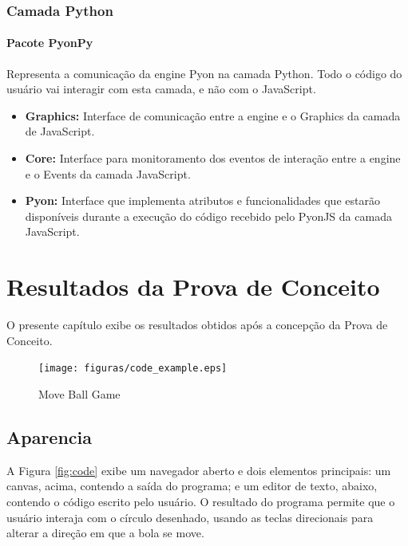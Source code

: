 \begin{apendicesenv}
\subsection{Camada Python}

\subsubsection{Pacote PyonPy}

Representa a comunicação da engine Pyon na camada Python. Todo o código do usuário vai interagir com esta camada, e não com o JavaScript.

\begin{itemize}
    \item \textbf{Graphics:} Interface de comunicação entre a engine e o Graphics da camada de JavaScript.
    \item \textbf{Core:} Interface para monitoramento dos eventos de interação entre a engine e o Events da camada JavaScript.
    \item \textbf{Pyon:} Interface que implementa atributos e funcionalidades que estarão disponíveis durante a execução do código recebido pelo PyonJS da camada JavaScript.
\end{itemize}

%
%

\chapter[Resultados da Prova de Conceito]{Resultados da Prova de Conceito}
\label{apendice:resultados_poc}

O presente capítulo exibe os resultados obtidos após a concepção da Prova de Conceito.

\begin{figure}[!ht]
    \centering
    \caption{Move Ball Game}
    \texttt{[image: figuras/code\_example.eps]}
    \label{fig:arquitetura_poc_code}
\end{figure}

\section{Aparencia}

A Figura \ref{fig:code} exibe um navegador aberto e dois elementos principais: um canvas, acima, contendo a saída do programa; e um editor de texto, abaixo, contendo o código escrito pelo usuário. O resultado do programa permite que o usuário interaja com o círculo desenhado, usando as teclas direcionais para alterar a direção em que a bola se move.


\end{apendicesenv}
